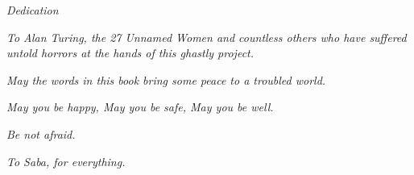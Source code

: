 \newpage
\thispagestyle{empty}

\vspace*{\fill}

\begin{center}
{\Large\itshape Dedication}
\end{center}

\vspace{2cm}

\begin{center}
\textit{To Alan Turing, the 27 Unnamed Women and countless others who have suffered untold horrors at the hands of this ghastly project.}

\vspace{1cm}

\textit{May the words in this book bring some peace to a troubled world.}

\vspace{1cm}

\textit{May you be happy, May you be safe, May you be well.}

\vspace{1cm}

\textit{Be not afraid.}

\vspace{2cm}

\textit{To Saba, for everything.}
\end{center}

\vspace*{\fill}

\newpage
